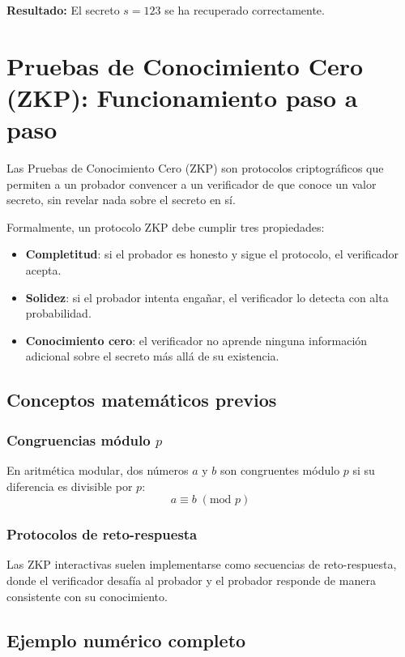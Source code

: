 \documentclass{article}
\begin{document}
\textbf{Resultado:}
El secreto \( s = 123 \) se ha recuperado correctamente.

\section{Pruebas de Conocimiento Cero (ZKP): Funcionamiento paso a paso}

Las Pruebas de Conocimiento Cero (ZKP) son protocolos criptográficos que permiten a un probador convencer a un verificador de que conoce un valor secreto, sin revelar nada sobre el secreto en sí.

Formalmente, un protocolo ZKP debe cumplir tres propiedades:
\begin{itemize}
    \item \textbf{Completitud}: si el probador es honesto y sigue el protocolo, el verificador acepta.
    \item \textbf{Solidez}: si el probador intenta engañar, el verificador lo detecta con alta probabilidad.
    \item \textbf{Conocimiento cero}: el verificador no aprende ninguna información adicional sobre el secreto más allá de su existencia.
\end{itemize}

\subsection{Conceptos matemáticos previos}

\subsubsection{Congruencias módulo \( p \)}
En aritmética modular, dos números \( a \) y \( b \) son congruentes módulo \( p \) si su diferencia es divisible por \( p \):
\[
a \equiv b \; (\text{mod } p)
\]

\subsubsection{Protocolos de reto-respuesta}
Las ZKP interactivas suelen implementarse como secuencias de reto-respuesta, donde el verificador desafía al probador y el probador responde de manera consistente con su conocimiento.

\subsection{Ejemplo numérico completo}
\end{document}
